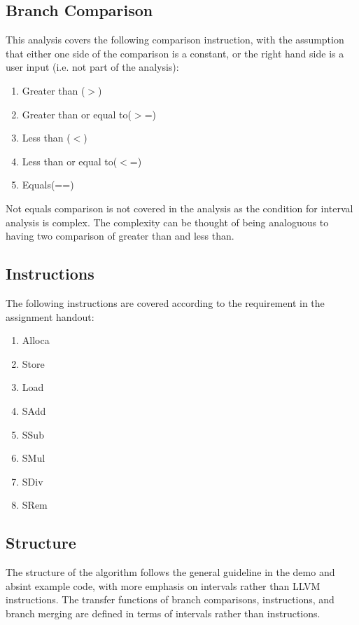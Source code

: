 \documentclass[11pt,a4paper,fleqn]{article}
\begin{document}
\subsection{Branch Comparison}

This analysis covers the following comparison instruction, with the assumption that either one side of the comparison is a constant, or the right hand side is a user input (i.e. not part of the analysis):

\begin{enumerate}
   \item Greater than ($>$)
   \item Greater than or equal to($>$=)
   \item Less than ($<$)
   \item Less than or equal to($<$=)
   \item Equals(==)
\end{enumerate}

Not equals comparison is not covered in the analysis as the condition for interval analysis is complex.
The complexity can be thought of being analoguous to having two comparison of greater than and less than.

\subsection{Instructions}

The following instructions are covered according to the requirement in the assignment handout:

\begin{enumerate}
   \item Alloca
   \item Store
   \item Load
   \item SAdd
   \item SSub
   \item SMul
   \item SDiv
   \item SRem
\end{enumerate}

\subsection {Structure}

The structure of the algorithm follows the general guideline in the demo and absint example code, with more emphasis on intervals rather than LLVM instructions.
The transfer functions of branch comparisons, instructions, and branch merging are defined in terms of intervals rather than instructions.
\end{document}
